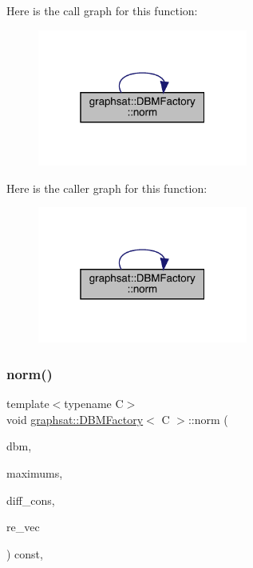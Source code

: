 Here is the call graph for this function\+:
\nopagebreak
\begin{figure}[H]
\begin{center}
\leavevmode
\includegraphics[width=196pt]{classgraphsat_1_1_d_b_m_factory_a51513da611d3b528219e7204498c035b_cgraph}
\end{center}
\end{figure}
Here is the caller graph for this function\+:
\nopagebreak
\begin{figure}[H]
\begin{center}
\leavevmode
\includegraphics[width=196pt]{classgraphsat_1_1_d_b_m_factory_a51513da611d3b528219e7204498c035b_icgraph}
\end{center}
\end{figure}
\mbox{\label{classgraphsat_1_1_d_b_m_factory_aba7883693f33b40f126bb406f6ead2c6}} 
\subsubsection{\texorpdfstring{norm()}{norm()}\hspace{0.1cm}{\footnotesize\ttfamily [4/4]}}
{\footnotesize\ttfamily template$<$typename C$>$ \\
void \mbox{\hyperlink{classgraphsat_1_1_d_b_m_factory}{graphsat\+::\+D\+B\+M\+Factory}}$<$ C $>$\+::norm (\begin{DoxyParamCaption}\item[{C $\ast$}]{dbm,  }\item[{const vector$<$ C $>$ \&}]{maximums,  }\item[{const vector$<$ \mbox{\hyperlink{classgraphsat_1_1_clock_constraint}{Clock\+Constraint}}$<$ C $>$$>$ \&}]{diff\+\_\+cons,  }\item[{vector$<$ C $\ast$ $>$ \&}]{re\+\_\+vec }\end{DoxyParamCaption}) const\hspace{0.3cm}{\ttfamily [inline]}, {\ttfamily [private]}}

